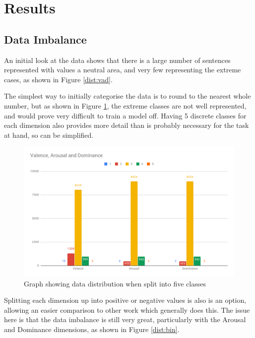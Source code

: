 \section{Results}
\subsection{Data Imbalance}
An initial look at the data shows that there is a large number of sentences represented with values a neutral area, and very few representing the extreme cases, as shown in Figure \ref{dist:vad}.

The simplest way to initially categorise the data is to round to the nearest whole number, but as shown in Figure \ref{dist:5cat}, the extreme classes are not well represented, and would prove very difficult to train a model off. Having 5 discrete classes for each dimension also provides more detail than is probably necessary for the task at hand, so can be simplified.

\begin{figure}[h]
\centering
\includegraphics[scale=0.3]{graphs/5catDist.png}
\caption{Graph showing data distribution when split into five classes}
\label{dist:5cat}
\end{figure}

Splitting each dimension up into positive or negative values is also is an option, allowing an easier comparison to other work which generally does this. The issue here is that the data imbalance is still very great, particularly with the Arousal and Dominance dimensions, as shown in Figure \ref{dist:bin}.

